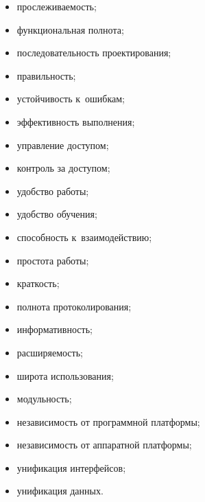      \begin{itemize}

     \item прослеживаемость;

     \item функциональная полнота;

     \item последовательность проектирования;

     \item правильность;

     \item устойчивость к~ошибкам;

     \item эффективность выполнения;

     \item управление доступом;

     \item контроль за доступом;

     \item удобство работы;

     \item удобство обучения;

     \item способность к~взаимодействию;

     \item простота работы;

     \item краткость;

     \item полнота протоколирования;

     \item информативность;

     \item расширяемость;

     \item широта использования;

     \item модульность;

     \item независимость от программной платформы;

     \item независимость от аппаратной платформы;

     \item унификация интерфейсов;

     \item унификация данных.

     \end{itemize}


